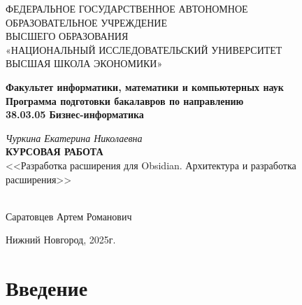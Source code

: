 \documentclass[14pt]{extarticle}
\begin{document}
	
	\begin{titlepage}
		\begin{center}
			\normalsize
			\normalsize{ФЕДЕРАЛЬНОЕ ГОСУДАРСТВЕННОЕ АВТОНОМНОЕ\\ОБРАЗОВАТЕЛЬНОЕ УЧРЕЖДЕНИЕ\\ВЫСШЕГО ОБРАЗОВАНИЯ\\«НАЦИОНАЛЬНЫЙ ИССЛЕДОВАТЕЛЬСКИЙ УНИВЕРСИТЕТ\\ВЫСШАЯ ШКОЛА ЭКОНОМИКИ»}
			
			\vfill
			
			\textbf{Факультет информатики, математики и компьютерных наук}\\[3mm]
			\textbf{Программа подготовки бакалавров по направлению\\38.03.05 Бизнес-информатика}
			
			\vfill
			
			\textit{Чуркина Екатерина Николаевна}\\[3mm]
			\textbf{КУРСОВАЯ РАБОТА}\\[10mm]
			\normalsize{<<Разработка расширения для Obsidian. Архитектура и разработка расширения>>}
			
		\end{center}
		
		\vfill
		\newlength{\ML}
		\hfill
		\begin{minipage}{0.4\textwidth}
			\\[2mm]
			Саратовцев Артем Романович
		\end{minipage}%
		
		\vfill
		\begin{center}
			Нижний Новгород, 2025г.
		\end{center}
	\end{titlepage}
	
	
	\setcounter{page}{2}	
	\newpage
	\tableofcontents
	\newpage
	
	\section*{Введение}
	
\end{document}

